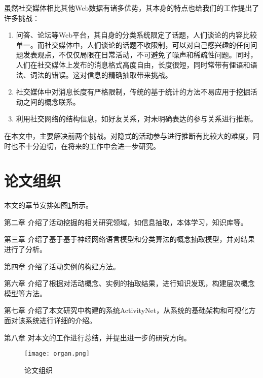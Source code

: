 虽然社交媒体相比其他Web数据有诸多优势，其本身的特点也给我们的工作提出了许多挑战：

\begin{enumerate}
\item 问答、论坛等Web平台，其自身的分类系统限定了话题，人们谈论的内容比较单一。而社交媒体中，人们谈论的话题不收限制，可以对自己感兴趣的任何问题发表观点，不仅仅局限在日常活动，不可避免了噪声和稀疏性问题。同时，人们在社交媒体上发布的消息格式高度自由，长度很短，同时常带有俚语和语法、词法的错误。这对信息的精确抽取带来挑战。
\item 社交媒体中对消息长度有严格限制，传统的基于统计的方法不易应用于挖掘活动之间的概念联系。
\item 利用社交网络的结构信息，如好友关系，对未明确表达的参与关系进行推断。
\end{enumerate}

在本文中，主要解决前两个挑战。对隐式的活动参与进行推断有比较大的难度，同时也不十分迫切，在将来的工作中会进一步研究。

\section{论文组织}
本文的章节安排如图\ref{fig:organ}所示。

{\heiti 第二章} 介绍了活动挖掘的相关研究领域，如信息抽取，本体学习，知识库等。

{\heiti 第三章} 介绍了基于基于神经网络语言模型和分类算法的概念抽取模型，并对结果进行了分析。

{\heiti 第四章} 介绍了活动实例的构建方法。

{\heiti 第六章} 介绍了根据对活动概念、实例的抽取结果，进行知识发现，构建层次概念模型等方法。

{\heiti 第七章} 介绍了本文研究中构建的系统ActivityNet，从系统的基础架构和可视化方面对该系统进行详细的介绍。

{\heiti 第八章} 对本文的工作进行总结，并提出进一步的研究方向。

\begin{figure}[!h]
\caption{论文组织}
\label{fig:organ}
\begin{center}
\texttt{[image: organ.png]}
\end{center}
\end{figure}

